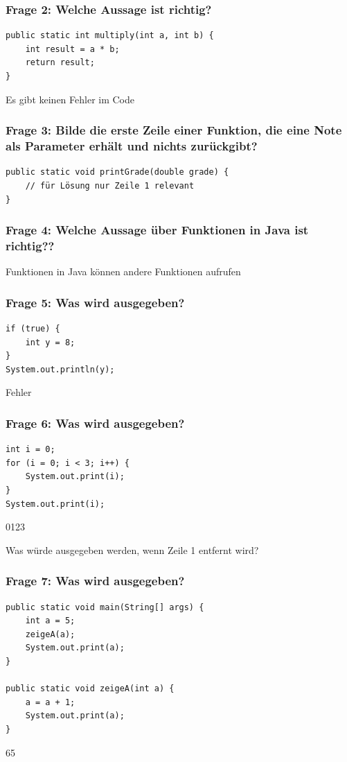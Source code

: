 \documentclass{../../presentation}
\begin{document}
\begin{frame}[fragile]
	\frametitle{Frage 2: Welche Aussage ist richtig?}
	\begin{verbatim}
public static int multiply(int a, int b) {
    int result = a * b;
    return result;
}
  \end{verbatim}
	\begin{ausgabe}
		Es gibt keinen Fehler im Code
	\end{ausgabe}
\end{frame}

\begin{frame}[fragile]
	\frametitle{Frage 3: Bilde die erste Zeile einer Funktion, die eine Note als Parameter erhält und nichts zurückgibt?}
	\begin{verbatim}
public static void printGrade(double grade) {
    // für Lösung nur Zeile 1 relevant
}

  \end{verbatim}
\end{frame}

\begin{frame}[fragile]
	\frametitle{Frage 4: Welche Aussage über Funktionen in Java ist richtig??}
	\begin{ausgabe}
		Funktionen in Java können andere Funktionen aufrufen
	\end{ausgabe}
\end{frame}

\begin{frame}[fragile]
	\frametitle{Frage 5: Was wird ausgegeben?}
	\begin{verbatim}
if (true) {
    int y = 8;
}
System.out.println(y);

  \end{verbatim}
	\begin{ausgabe}
		Fehler
	\end{ausgabe}
\end{frame}

\begin{frame}[fragile]
	\frametitle{Frage 6: Was wird ausgegeben?}
	\begin{verbatim}
int i = 0;
for (i = 0; i < 3; i++) {
    System.out.print(i);
}
System.out.print(i);
  \end{verbatim}
	\begin{ausgabe}
		0123
	\end{ausgabe}
	Was würde ausgegeben werden, wenn Zeile 1 entfernt wird?
\end{frame}

\begin{frame}[fragile]
	\frametitle{Frage 7: Was wird ausgegeben?}
	\begin{verbatim}
public static void main(String[] args) {
    int a = 5;
    zeigeA(a);
    System.out.print(a);
}

public static void zeigeA(int a) {
    a = a + 1;
    System.out.print(a);
}
  \end{verbatim}
	\begin{ausgabe}
		65
	\end{ausgabe}
\end{frame}
\end{document}
